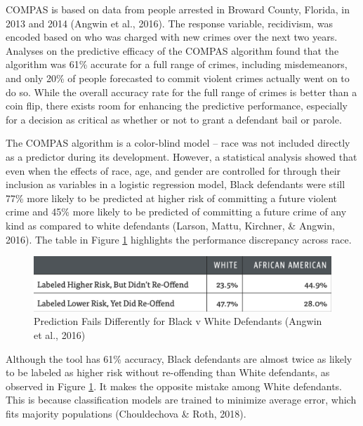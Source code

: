 \documentclass[12pt, twoside]{amherstthesis}
\begin{document}
COMPAS is based on data from people arrested in Broward County, Florida, in 2013 and 2014 (Angwin et al., 2016). The response variable, recidivism, was encoded based on who was charged with new crimes over the next two years. Analyses on the predictive efficacy of the COMPAS algorithm found that the algorithm was 61\% accurate for a full range of crimes, including misdemeanors, and only 20\% of people forecasted to commit violent crimes actually went on to do so. While the overall accuracy rate for the full range of crimes is better than a coin flip, there exists room for enhancing the predictive performance, especially for a decision as critical as whether or not to grant a defendant bail or parole.

The COMPAS algorithm is a color-blind model -- race was not included directly as a predictor during its development. However, a statistical analysis showed that even when the effects of race, age, and gender are controlled for through their inclusion as variables in a logistic regression model, Black defendants were still 77\% more likely to be predicted at higher risk of committing a future violent crime and 45\% more likely to be predicted of committing a future crime of any kind as compared to white defendants (Larson, Mattu, Kirchner, \& Angwin, 2016). The table in Figure \ref{fig:compas1} highlights the performance discrepancy across race.
\begin{figure}

{\centering \includegraphics[width=1\linewidth]{figures/compas1} 

}

\caption[COMPAS Prediction Fails Differently for Black v White Defendants]{Prediction Fails Differently for Black v White Defendants (Angwin et al., 2016)}\label{fig:compas1}
\end{figure}
Although the tool has 61\% accuracy, Black defendants are almost twice as likely to be labeled as higher risk without re-offending than White defendants, as observed in Figure \ref{fig:compas1}. It makes the opposite mistake among White defendants. This is because classification models are trained to minimize average error, which fits majority populations (Chouldechova \& Roth, 2018).
\end{document}
